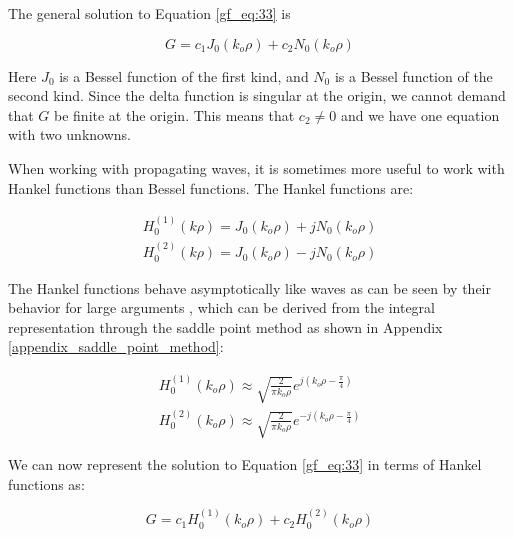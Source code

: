\noindent The general solution to Equation \ref{gf_eq:33} is 

\begin{equation}
G = c_1J_0\left(k_o\rho\right) + c_2N_0\left(k_o\rho\right)
\label{gf_eq:35}
\end{equation}
\renewcommand{\baselinestretch}{2} \small\normalsize

Here $J_0$ is a Bessel function of the first kind, and $N_0$ is a Bessel function of the second kind. Since the delta function is singular at the origin, we cannot demand that $G$ be finite at the origin. This means that $c_2 \neq 0$ and we have one equation with two unknowns.

When working with propagating waves, it is sometimes more useful to work with Hankel functions than Bessel functions. The Hankel functions are:

\begin{equation}
\begin{gathered}
H_0^{(1)}(k\rho) = J_0(k_o\rho) + jN_0(k_o\rho) \\
H_0^{(2)}(k\rho) = J_0(k_o\rho) - jN_0(k_o\rho)
\label{gf_eq:36}
\end{gathered}
\end{equation}
\renewcommand{\baselinestretch}{2} \small\normalsize

The Hankel functions behave asymptotically like waves as can be seen by their behavior for large arguments \cite{abramowitz_stegun}, which can be derived from the integral representation through the saddle point method as shown in Appendix \ref{appendix_saddle_point_method}:

\begin{equation}
\begin{gathered}
H_0^{(1)}(k_o\rho) \approx \sqrt{\frac{2}{\pi k_o\rho}}e^{j\left(k_o\rho - \frac{\pi}{4}\right)}\\
H_0^{(2)}(k_o\rho) \approx \sqrt{\frac{2}{\pi k_o\rho}}e^{-j\left(k_o\rho - \frac{\pi}{4}\right)}
\label{gf_eq:36a}
\end{gathered}
\end{equation}
\renewcommand{\baselinestretch}{2} \small\normalsize

We can now represent the solution to Equation \ref{gf_eq:33} in terms of Hankel functions as:

\begin{equation}
G = c_1H_0^{(1)}\left(k_o\rho\right) +c_2H_0^{(2)}\left(k_o\rho\right) 
\label{gf_eq:37}
\end{equation}
\renewcommand{\baselinestretch}{2} \small\normalsize

